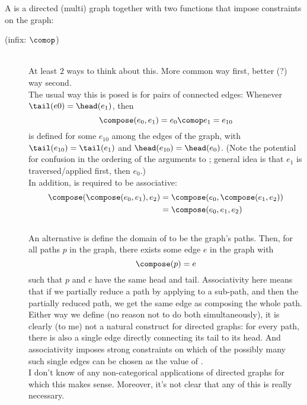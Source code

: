 \documentclass[11pt,openany]{book}
\begin{document}
\begin{definition}
A  is a directed (multi) graph 
together with two functions that impose constraints
on the graph:
\begin{description}
\item[\compose \textrm{\textup{(infix: $\comop$)}}]\mbox{}\\
At least $2$ ways to think about this. 
More common way first, better (?) way second.\\
The usual way this is posed is for pairs of connected edges:
Whenever $\tail(e0) = \head(e_1)$,
then
\[ \compose(e_0,e_1) = e_0 \comop e_1 = e_{10} \]
is defined
for some $e_{10}$ among the edges of the graph,
with $\tail(e_{10}) = \tail(e_1)$
and $\head(e_{10}) = \head(e_0)$.
(Note the potential for confusion 
in the ordering of the arguments to \compose;
general idea is that $e_1$ is traversed/applied first,
then $e_0$.) \\
In addition, \compose is required to be associative:
\begin{align*}
\compose(\compose(e_0,e_1),e_2) 
&
= \compose(e_0,\compose(e_1,e_2))
\\
&
= \compose(e_0,e_1,e_2)
\end{align*}
\\
An alternative is define the domain of \compose
to be the graph's paths. 
Then, for all paths $p$ in the graph,
there exists some edge $e$ in the graph
with 
\begin{equation*}
\compose(p) = e
\end{equation*} 
such that 
$p$ and $e$ have the same head and tail.
Associativity here means that if we partially reduce a path
by applying \compose to a sub-path,
and then \compose the partially reduced path,
we get the same edge as composing the whole path.
\\
Either way we define \compose (no reason not to do both
simultaneously), it is clearly (to me) not a natural construct
for directed graphs: for every path, there is also 
a single edge directly connecting its tail to its head.
And associativity imposes strong constraints on which of the possibly
many such single edges can be chosen as the value of \compose.
\\
I don't know of any non-categorical applications of directed graphs
for which this makes sense.
Moreover, it's not clear that any of this is really necessary.
\\
\item[\identity]\mbox{}\\

\end{description}
\end{definition}
\end{document}
